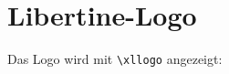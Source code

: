 %
%
%
%
%
%

%
%
%
%
%
%
%


\section{Libertine-Logo}

Das Logo wird mit \verb|\xllogo| angezeigt: {\Huge\xllogo}



\endinput

